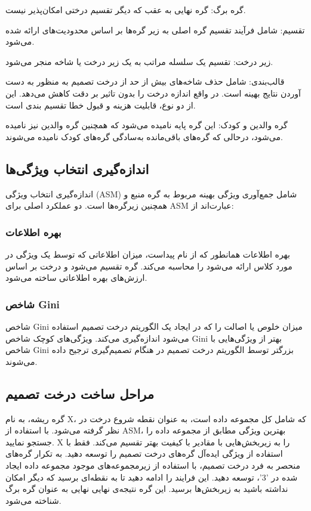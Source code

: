 \documentclass{CSICC2020}
\begin{document}
 گره برگ: گره نهایی به عقب که دیگر تقسیم درختی امکان‌پذیر نیست. 


 تقسیم: شامل فرآیند تقسیم گره اصلی به زیر گره‌ها بر اساس محدودیت‌های ارائه شده می‌شود. 


 زیر درخت: تقسیم یک سلسله مراتب به یک زیر درخت یا شاخه منجر می‌شود. 


 قالب‌بندی: شامل حذف شاخه‌های بیش از حد از درخت تصمیم به منظور به دست آوردن نتایج بهینه است. در واقع اندازه درخت را بدون تاثیر بر دقت کاهش می‌دهد. این از دو نوع، قابلیت هزینه و قبول خطا تقسیم بندی است. 


 گره والدین و کودک: این گره پایه نامیده می‌شود که همچنین گره والدین نیز نامیده می‌شود، درحالی که گره‌های باقی‌مانده به‌سادگی گره‌های کودک نامیده می‌شوند. 
\subsection{اندازه‌گیری انتخاب ویژگی‌ها}
اندازه‌گیری انتخاب ویژگی (ASM) شامل جمع‌آوری ویژگی بهینه مربوط به گره منبع و همچنین زیرگره‌ها است. دو عملکرد اصلی برای ASM عبارت‌اند از: 
\subsubsection{بهره اطلاعات}
بهره اطلاعات همانطور که از نام پیداست، میزان اطلاعاتی که توسط یک ویژگی در مورد کلاس ارائه می‌شود را محاسبه می‌کند. گره تقسیم می‌شود و درخت بر اساس ارزش‌های بهره اطلاعاتی ساخته می‌شود. 
\subsubsection{شاخص Gini}
شاخص Gini میزان خلوص یا اصالت را که در ایجاد یک الگوریتم درخت تصمیم استفاده می‌شود اندازه‌گیری می‌کند. ویژگی‌های کوچک شاخص Gini بهتر از ویژگی‌هایی با شاخص Gini بزرگتر توسط الگوریتم درخت تصمیم در هنگام تصمیم‌گیری ترجیح داده می‌شوند. 
\subsection{مراحل ساخت درخت تصمیم}
گره ریشه، به نام X، که شامل کل مجموعه داده است، به عنوان نقطه شروع درخت در نظر گرفته می‌شود. 
 با استفاده از ASM، بهترین ویژگی مطابق از مجموعه داده را جستجو نمایید. 
 X را به زیربخش‌هایی با مقادیر با کیفیت بهتر تقسیم می‌کند. 
 فقط با استفاده از ویژگی ایده‌آل گره‌های درخت تصمیم را توسعه دهید. 
 به تکرار گره‌های منحصر به فرد درخت تصمیم، با استفاده از زیرمجموعه‌های موجود مجموعه داده ایجاد شده در '3'، توسعه دهید. 
 این فرایند را ادامه دهید تا به نقطه‌ای برسید که دیگر امکان نداشته باشید به زیربخش‌ها برسید. 
 این گره نتیجه‌ی نهایی نهایی به عنوان گره برگ شناخته می‌شود. 
\end{document}
